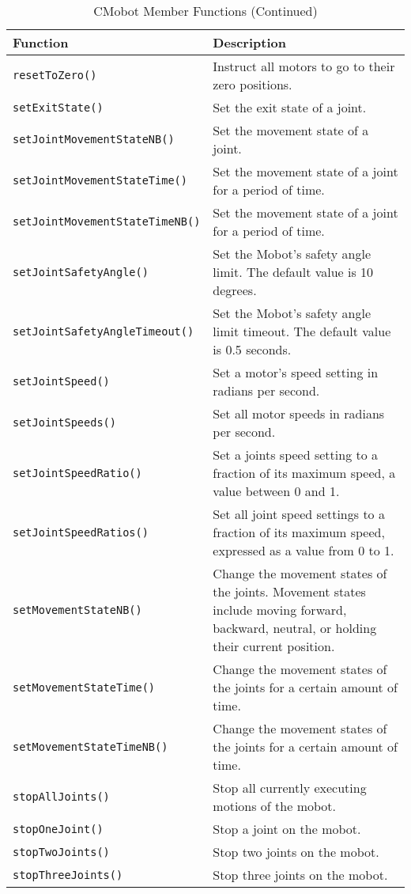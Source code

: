 \begin{table}[!h]
\begin{center}
\caption{CMobot Member Functions (Continued)}
\begin{tabular}{p{48 mm}p{110 mm}}
\hline
Function & Description \\
\hline
\texttt{resetToZero()} & Instruct all motors to go to their zero positions. \\
\texttt{setExitState()} & Set the exit state of a joint. \\
\texttt{setJointMovementStateNB()} & Set the movement state of a joint. \\
\texttt{setJointMovementStateTime()} & Set the movement state of a joint for a period of time.\\
\texttt{setJointMovementStateTimeNB()} & Set the movement state of a joint for a period of time.\\
\texttt{setJointSafetyAngle()} & Set the Mobot's safety angle limit. The default value is 10 degrees.\\
\texttt{setJointSafetyAngleTimeout()} & Set the Mobot's safety angle limit timeout. The default value is 0.5 seconds.\\
\texttt{setJointSpeed()} & Set a motor's speed setting in radians per second. \\
\texttt{setJointSpeeds()} & Set all motor speeds in radians per second. \\
\texttt{setJointSpeedRatio()} & Set a joints speed setting to a fraction of its maximum speed, a value between 0 and 1. \\
\texttt{setJointSpeedRatios()} & Set all joint speed settings to a fraction of its
maximum speed, expressed as a value from 0 to 1. \\
\texttt{setMovementStateNB()} & Change the movement states of the joints. Movement states include moving forward, backward, neutral, or holding their current position.\\
\texttt{setMovementStateTime()} & Change the movement states of the joints for a certain amount of time.\\
\texttt{setMovementStateTimeNB()} & Change the movement states of the joints for a certain amount of time.\\
\texttt{stopAllJoints()} & Stop all currently executing motions of the mobot. \\
\texttt{stopOneJoint()} & Stop a joint on the mobot. \\
\texttt{stopTwoJoints()} & Stop two joints on the mobot. \\
\texttt{stopThreeJoints()} & Stop three joints on the mobot. \\
\hline
\end{tabular}
\end{center}
\label{mobilec_api_cbinary}
\end{table}

